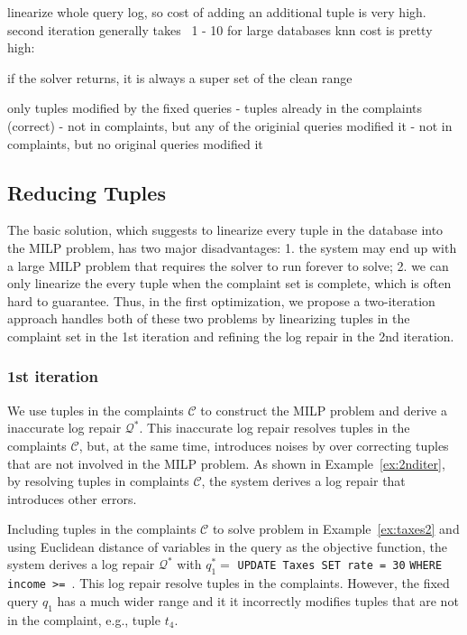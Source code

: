 linearize whole query log, so cost of adding an additional tuple is very high.
second iteration generally takes ~1 - 10%
for large databases knn cost is pretty high: ~

if the solver returns, it is always a super set of the clean range

only tuples modified by the fixed queries
- tuples already in the complaints (correct)
- not in complaints, but any of the originial queries modified it
- not in complaints, but no original queries modified it



\subsection{Reducing Tuples}
\label{sec:opt:tbsize}

The basic solution, which suggests to linearize every tuple in the database into the MILP problem,
has two major disadvantages: 1. the system may end up with a large MILP problem that requires 
the solver to run forever to solve; 2. we can only linearize the every tuple
when the complaint set is complete, which is often hard to guarantee. Thus, in the first 
optimization, we propose a two-iteration approach handles both of these two problems 
by linearizing tuples in the complaint set in
the 1st iteration and refining the log repair in the 2nd iteration. \\
\subsubsection{1st iteration}
We use tuples in the complaints $\mathcal{C}$ to construct the MILP problem and derive a 
inaccurate log repair $\mathcal{Q}^*$. This inaccurate 
log repair resolves tuples in the complaints $\mathcal{C}$, but, at the same time, 
introduces noises by over correcting tuples that are not involved in the MILP problem. 
As shown in Example~\ref{ex:2nditer}, by resolving tuples in complaints $\mathcal{C}$, 
the system derives a log repair that introduces other errors. 
\begin{example}\label{ex:2nditer}
Including tuples in the complaints $\mathcal{C}$ to solve problem in Example~\ref{ex:taxes2} 
and using Euclidean distance of variables in the query as the objective function, the system 
derives a log repair $\mathcal{Q}^*$ with $q_1^*=$ \texttt{\small UPDATE Taxes SET rate = 30}
\texttt{\small WHERE income >= \color{red}{9500.0001} \color{black}{and income <=} \color{red}{90000}}. 
This log repair resolve tuples in the complaints. However, the fixed query $q_1$ has a much wider range 
and it it incorrectly modifies tuples that are not in the complaint, e.g., tuple $t_4$.
\end{example}


